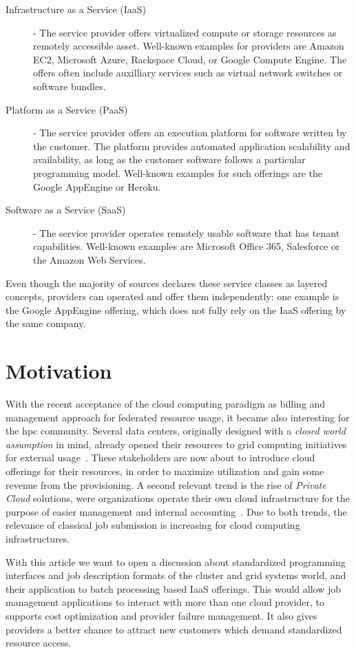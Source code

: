 \documentclass[twocolumn]{svjour3}       %
\begin{document}
\begin{description}
\item[Infrastructure as a Service (IaaS)] - The service provider offers virtualized compute or storage resources as remotely accessible asset. Well-known examples for providers are Amazon EC2, Microsoft Azure, Rackspace Cloud, or Google Compute Engine. The offers often include auxilliary services such as virtual network switches or software bundles. 
\item[Platform as a Service (PaaS)] - The service provider offers an execution platform for software written by the customer. The platform provides automated application scalability and availability, as long as the customer software follows a particular programming model. Well-known examples for such offerings are the Google AppEngine or Heroku.
\item[Software as a Service (SaaS)] - The service provider operates remotely usable software that has tenant capabilities. Well-known examples are Microsoft Office 365, Salesforce or the Amazon Web Services. 
\end{description}

Even though the majority of sources declares these service classes as layered concepts, providers can operated and offer them independently: one example is the Google AppEngine offering, which does not fully rely on the IaaS offering by the same company.

\section{Motivation}

With the recent acceptance of the cloud computing paradigm as billing and management approach for federated resource usage, it became also interesting for the \gls{hpc} community. Several data centers, originally designed with a \emph{closed world assumption} in mind, already opened their resources to grid computing initiatives for external usage~\cite{unicore}. These stakeholders are now about to introduce cloud offerings for their resources, in order to maximize utilization and gain some revenue from the provisioning. A second relevant trend is the rise of \emph{Private Cloud} solutions, were organizations operate their own cloud infrastructure for the purpose of easier management and internal accounting~\cite{}. Due to both trends, the relevance of classical job submission is increasing for cloud computing infrastructures. 

With this article we want to open a discussion about standardized programming interfaces and job description formats of the cluster and grid systems world, and their application to batch processing based IaaS offerings. This would allow job management applications to interact with more than one cloud provider, to supports cost optimization and provider failure management. It also gives providers a better chance to attract new customers which demand standardized resource access.
\end{document}
